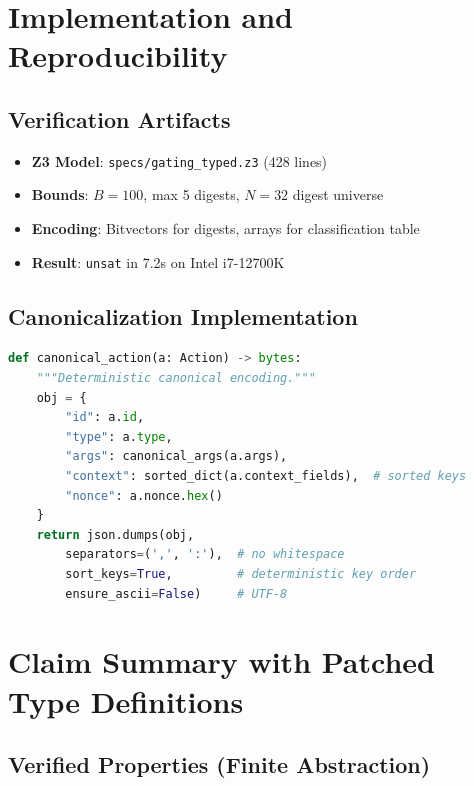 \documentclass[12pt]{article}
\begin{document}
\section{Implementation and Reproducibility}

\subsection{Verification Artifacts}

\begin{itemize}
    \item \textbf{Z3 Model}: \texttt{specs/gating\_typed.z3} (428 lines)
    \item \textbf{Bounds}: $B=100$, max 5 digests, $N=32$ digest universe
    \item \textbf{Encoding}: Bitvectors for digests, arrays for classification table
    \item \textbf{Result}: \texttt{unsat} in 7.2s on Intel i7-12700K
\end{itemize}

\subsection{Canonicalization Implementation}

\begin{lstlisting}[language=Python,basicstyle=\scriptsize]
def canonical_action(a: Action) -> bytes:
    """Deterministic canonical encoding."""
    obj = {
        "id": a.id,
        "type": a.type,
        "args": canonical_args(a.args),
        "context": sorted_dict(a.context_fields),  # sorted keys
        "nonce": a.nonce.hex()
    }
    return json.dumps(obj, 
        separators=(',', ':'),  # no whitespace
        sort_keys=True,         # deterministic key order
        ensure_ascii=False)     # UTF-8
\end{lstlisting}

\section{Claim Summary with Patched Type Definitions}

\subsection{Verified Properties (Finite Abstraction)}
\end{document}

